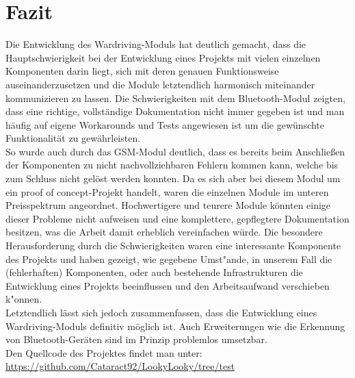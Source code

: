 \documentclass[a4paper,11pt, ngerman]{scrartcl}
\begin{document}
\section{Fazit}
Die Entwicklung des Wardriving-Moduls hat deutlich gemacht, dass die Hauptschwierigkeit bei der Entwicklung eines Projekts mit vielen einzelnen Komponenten darin liegt, sich mit deren genauen Funktionsweise auseinanderzusetzen und die Module letztendlich harmonisch miteinander kommunizieren zu lassen. Die Schwierigkeiten mit dem Bluetooth-Modul zeigten, dass eine richtige, vollständige Dokumentation nicht immer gegeben ist und man häufig auf eigene Workarounds und Tests angewiesen ist um die gewünschte Funktionalität zu gewährleisten.\\
So wurde auch durch das GSM-Modul deutlich, dass es bereits beim Anschließen der Komponenten zu nicht nachvollziehbaren Fehlern kommen kann, welche bis zum Schluss nicht gelöst werden konnten. Da es sich aber bei diesem Modul um ein \grqq proof of concept\grqq{}-Projekt handelt, waren die einzelnen Module im unteren Preisspektrum angeordnet. Hochwertigere und teurere Module könnten einige dieser Probleme nicht aufweisen und eine komplettere, gepflegtere Dokumentation besitzen, was die Arbeit damit erheblich vereinfachen würde. Die besondere Herausforderung durch die Schwierigkeiten waren eine interessante Komponente des Projekts und haben gezeigt, wie gegebene Umst"ande, in unserem Fall die (fehlerhaften) Komponenten, oder auch bestehende Infrastrukturen die Entwicklung eines Projekts beeinflussen und den Arbeitsaufwand verschieben k"onnen.\\
Letztendlich lässt sich jedoch zusammenfassen, dass die Entwicklung eines Wardriving-Moduls definitiv möglich ist. Auch Erweiterungen wie die Erkennung von Bluetooth-Geräten sind im Prinzip problemlos umsetzbar.\\
Den Quellcode des Projektes findet man unter:\\
\url{https://github.com/Cataract92/LookyLooky/tree/test}
\end{document}
